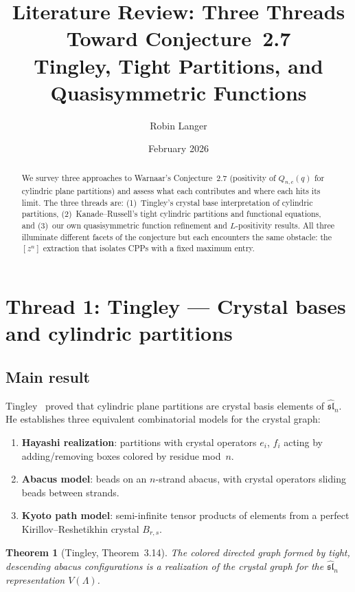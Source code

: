 \documentclass[11pt]{article}
\title{Literature Review: Three Threads Toward Conjecture~2.7\\
{\large Tingley, Tight Partitions, and Quasisymmetric Functions}}
\author{Robin Langer}
\date{February 2026}
\newtheorem{theorem}{Theorem}
\newcommand{\sln}{\widehat{\mathfrak{sl}}_n}
\begin{document}
\maketitle

\begin{abstract}
We survey three approaches to Warnaar's Conjecture~2.7
(positivity of $Q_{n,c}(q)$ for cylindric plane partitions)
and assess what each contributes and where each hits its limit.
The three threads are: (1)~Tingley's crystal base interpretation
of cylindric partitions, (2)~Kanade--Russell's tight cylindric
partitions and functional equations, and (3)~our own
quasisymmetric function refinement and $L$-positivity results.
All three illuminate different facets of the conjecture but
each encounters the same obstacle: the $[z^n]$ extraction
that isolates CPPs with a fixed maximum entry.
\end{abstract}

\section{Thread 1: Tingley --- Crystal bases and cylindric partitions}
\label{sec:tingley}

\subsection{Main result}

Tingley~\cite{tingley-2008} proved that cylindric plane partitions
are crystal basis elements of $\sln$. He establishes three
equivalent combinatorial models for the crystal graph:

\begin{enumerate}
  \item \textbf{Hayashi realization}: partitions with crystal
    operators $e_i$, $f_i$ acting by adding/removing boxes
    colored by residue mod~$n$.
  \item \textbf{Abacus model}: beads on an $n$-strand abacus,
    with crystal operators sliding beads between strands.
  \item \textbf{Kyoto path model}: semi-infinite tensor products
    of elements from a perfect Kirillov--Reshetikhin crystal
    $B_{r,s}$.
\end{enumerate}

\begin{theorem}[Tingley, Theorem~3.14]
The colored directed graph formed by tight, descending abacus
configurations is a realization of the crystal graph for the
$\sln$ representation $V(\Lambda)$.
\end{theorem}
\end{document}
